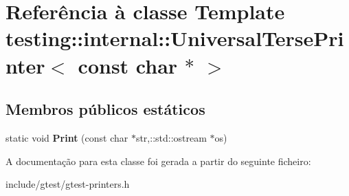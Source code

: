\hypertarget{classtesting_1_1internal_1_1UniversalTersePrinter_3_01const_01char_01_5_01_4}{\section{Referência à classe Template testing\-:\-:internal\-:\-:Universal\-Terse\-Printer$<$ const char $\ast$ $>$}
\label{classtesting_1_1internal_1_1UniversalTersePrinter_3_01const_01char_01_5_01_4}
}
\subsection*{Membros públicos estáticos}
\begin{DoxyCompactItemize}
\item 
\hypertarget{classtesting_1_1internal_1_1UniversalTersePrinter_3_01const_01char_01_5_01_4_aa7bc28677539f2f151e8fbcd9c573655}{static void {\bfseries Print} (const char $\ast$str,\-::std\-::ostream $\ast$os)}\label{classtesting_1_1internal_1_1UniversalTersePrinter_3_01const_01char_01_5_01_4_aa7bc28677539f2f151e8fbcd9c573655}

\end{DoxyCompactItemize}


A documentação para esta classe foi gerada a partir do seguinte ficheiro\-:\begin{DoxyCompactItemize}
\item 
include/gtest/gtest-\/printers.\-h\end{DoxyCompactItemize}
